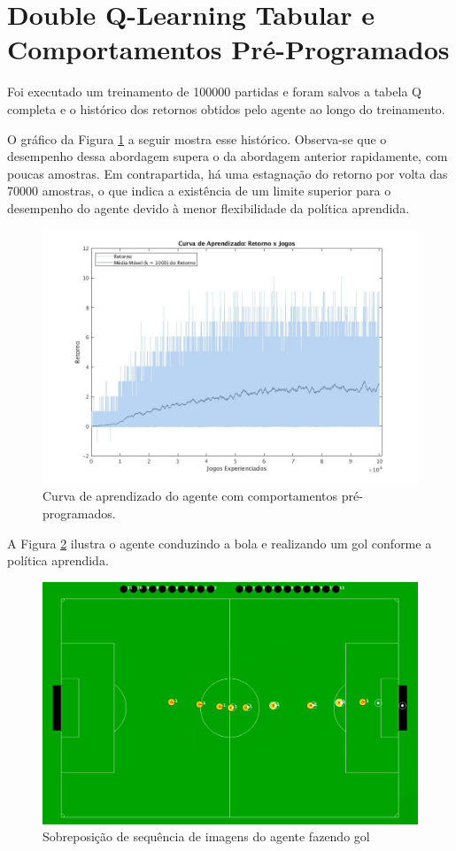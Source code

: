 \section{Double Q-Learning Tabular e Comportamentos Pré-Programados}

Foi executado um treinamento de 100000 partidas e foram salvos a tabela Q completa e o histórico dos retornos obtidos pelo agente ao longo do treinamento.

O gráfico da Figura \ref{fig:single-agent-tabular-behaviors} a seguir mostra esse histórico. Observa-se que o desempenho dessa abordagem supera o da abordagem anterior rapidamente, com poucas amostras. Em contrapartida, há uma estagnação do retorno por volta das 70000 amostras, o que indica a existência de um limite superior para o desempenho do agente devido à menor flexibilidade da política aprendida.

\begin{figure}[h]
	\includegraphics[width=0.9\linewidth]{figs/curva-behaviors-tabular.jpg}
	\centering
	\caption{Curva de aprendizado do agente com comportamentos pré-programados.}
	\label{fig:single-agent-tabular-behaviors}
\end{figure}

A Figura \ref{fig:goal-seq} ilustra o agente conduzindo a bola e realizando um gol conforme a política aprendida.

\begin{figure}[h]
	\includegraphics[width=0.9\linewidth]{figs/goal-sequence.png}
	\centering
	\caption{Sobreposição de sequência de imagens do agente fazendo gol}
	\label{fig:goal-seq}
\end{figure}

